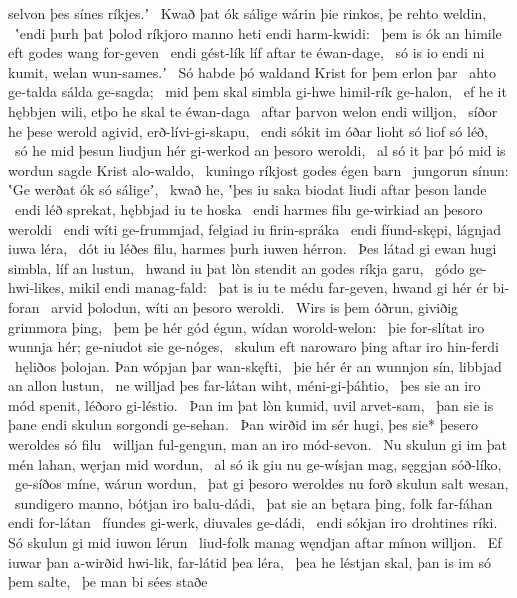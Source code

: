 selvon þes sínes ríkjes.ʼ \hld\ Kwað þat ók sálige wárin
þie rinkos, þe rehto weldin, \hld\ ʽendi þurh þat þolod ríkjoro manno
heti endi harm-kwidi: \hld\ þem is ók an himile eft
godes wang for-geven \hld\ endi gést-lík líf
aftar te éwan-dage, \hld\ só is io endi ni kumit,
welan wun-sames.ʼ \hld\ Só habde þó waldand Krist
for þem erlon þar \hld\ ahto ge-talda
sálda ge-sagda; \hld\ mid þem skal simbla gi-hwe
himil-rík ge-halon, \hld\ ef he it hębbjen wili,
etþo he skal te éwan-daga \hld\ aftar þarvon
welon endi willjon, \hld\ síðor he þese werold agivid,
erð-lívi-gi-skapu, \hld\ endi sókit im óðar lioht
só liof só léð, \hld\ só he mid þesun liudjun hér
gi-werkod an þesoro weroldi, \hld\ al só it þar þó mid is wordun sagde
Krist alo-waldo, \hld\ kuningo ríkjost
godes égen barn \hld\ jungorun sínun:
ʽGe werðat ók só sáligeʼ, \hld\ kwað he, ʽþes iu saka biodat
liudi aftar þeson lande \hld\ endi léð sprekat,
hębbjad iu te hoska \hld\ endi harmes filu
ge-wirkiad an þesoro weroldi \hld\ endi wíti ge-frummjad,
felgiad iu firin-spráka \hld\ endi fíund-skępi,
lágnjad iuwa léra, \hld\ dót iu léðes filu,
harmes þurh iuwen hérron. \hld\ Þes látad gi ewan hugi simbla,
líf an lustun, \hld\ hwand iu þat lòn stendit
an godes ríkja garu, \hld\ gódo ge-hwi-likes,
mikil endi manag-fald: \hld\ þat is iu te médu far-geven,
hwand gi hér ér bi-foran \hld\ arvid þolodun,
wíti an þesoro weroldi. \hld\ Wirs is þem óðrun,
giviðig grimmora þing, \hld\ þem þe hér gód égun,
wídan worold-welon: \hld\ þie for-slítat iro wunnja hér;
ge-niudot sie ge-nóges, \hld\ skulun eft narowaro þing
aftar iro hin-ferdi \hld\ hęliðos þolojan.
Þan wópjan þar wan-skęfti, \hld\ þie hér ér an wunnjon sín,
libbjad an allon lustun, \hld\ ne willjad þes far-látan wiht,
méni-gi-þáhtio, \hld\ þes sie an iro mód spenit,
léðoro gi-léstio. \hld\ Þan im þat lòn kumid,
uvil arvet-sam, \hld\ þan sie is þane endi skulun
sorgondi ge-sehan. \hld\ Þan wirðid im sér hugi,
þes sie* þesero weroldes só filu \hld\ willjan ful-gengun,
man an iro mód-sevon. \hld\ Nu skulun gi im þat mén lahan,
węrjan mid wordun, \hld\ al só ik giu nu ge-wísjan mag,
sęggjan sóð-líko, \hld\ ge-síðos míne,
wárun wordun, \hld\ þat gi þesoro weroldes nu forð
skulun salt wesan, \hld\ sundigero manno,
bótjan iro balu-dádi, \hld\ þat sie an bętara þing,
folk far-fáhan endi for-látan \hld\ fíundes gi-werk,
diuvales ge-dádi, \hld\ endi sókjan iro drohtines ríki.
Só skulun gi mid iuwon lérun \hld\ liud-folk manag
węndjan aftar mínon willjon. \hld\ Ef iuwar þan a-wirðid hwi-lik,
far-látid þea léra, \hld\ þea he léstjan skal,
þan is im só þem salte, \hld\ þe man bi sées staðe
